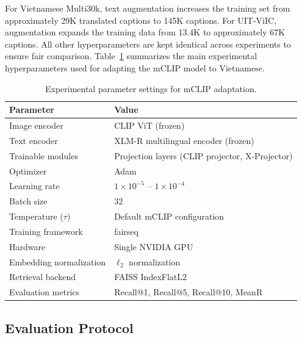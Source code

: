 For Vietnamese Multi30k, text augmentation increases the training set from approximately 29K translated captions to 145K captions. For UIT-ViIC, augmentation expands the training data from 13.4K to approximately 67K captions. All other hyperparameters are kept identical across experiments to ensure fair comparison. Table~\ref{tab:training_params} summarizes the main experimental hyperparameters used for adapting the mCLIP model to Vietnamese.

\begin{table}[ht]
\centering
\caption{Experimental parameter settings for mCLIP adaptation.}
\label{tab:training_params}
\scriptsize
\renewcommand{\arraystretch}{1.2}
\begin{tabular}{|l|l|}
\hline
\textbf{Parameter} & \textbf{Value} \\
\hline
Image encoder & CLIP ViT (frozen) \\
\hline
Text encoder & XLM-R multilingual encoder (frozen) \\
\hline
Trainable modules & Projection layers (CLIP projector, X-Projector) \\
\hline
Optimizer & Adam \\
\hline
Learning rate & $1 \times 10^{-5}$ -- $1 \times 10^{-4}$ \\
\hline
Batch size & 32 \\
\hline
Temperature ($\tau$) & Default mCLIP configuration \\
\hline
Training framework & fairseq \\
\hline
Hardware & Single NVIDIA GPU \\
\hline
Embedding normalization & $\ell_2$ normalization \\
\hline
Retrieval backend & FAISS IndexFlatL2 \\
\hline
Evaluation metrics & Recall@1, Recall@5, Recall@10, MeanR \\
\hline
\end{tabular}
\end{table}
\subsection{Evaluation Protocol}


